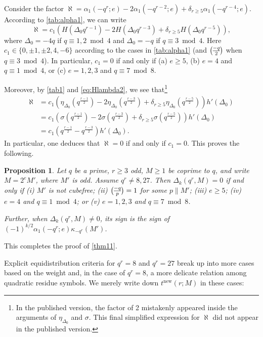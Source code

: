 \documentclass[11pt]{amsart}
\newcommand{\new}{\mathrm{new}}
\renewcommand{\mod}{\bmod}
\newcommand{\leg}{\overwithdelims ()}
\numberwithin{lem}{section}
\newtheorem{prop}[lem]{Proposition}
\theoremstyle{remark}
\theoremstyle{definition}
\numberwithin{equation}{section}
\begin{document}
Consider the factor $\aleph = \alpha_1(-q^r; e)  - 2\alpha_1(-q^{r-2}; e) + \delta_{r \ge 5} \alpha_1(-q^{r-4}; e)$.  According to \cref{tab:alpha1}, we can write
\[ \aleph = c_1 \left( H(\Delta_0 q^{r-1}) - 2 H(\Delta_0 q^{r-3}) + \delta_{r \ge 5} H(\Delta_0 q^{r-5}) \right), \]
where $\Delta_0 = -4q$ if $q \equiv 1, 2 \mod 4$ and $\Delta_0 =-q$ if $q \equiv 3 \mod 4$.  Here $c_1 \in \{ 0, \pm 1, \pm 2, 4, -6 \}$ according to the cases in \cref{tab:alpha1} (and ${-q \leg 2}$ when $q \equiv 3 \mod 4$).  In particular, $c_1 = 0$ if and only if
 (a) $e \ge 5$, (b) $e = 4$ and $q \equiv 1 \mod 4$, or (c)
$e = 1,2,3$ and $q \equiv 7 \mod 8$.

Moreover, by \cref{tab1} and \eqref{eq:Hlambda2}, we see that\footnote{In the published version, the factor of 2 mistakenly appeared inside the arguments of $\eta_{\Delta_0}$ and $\sigma$.  This final simplified expression for $\aleph$ did not appear in the published version.}
\begin{align*}
 \aleph &= c_1  \left( \eta_{\Delta_0}(q^{\frac{r-1}2}) - 2\eta_{\Delta_0}(q^{\frac{r-3}2})
+ \delta_{r \ge 5}\eta_{\Delta_0}( q^{\frac{r-5}2} ) \right) h'(\Delta_0) \\
&= c_1  \left( \sigma(q^{\frac{r-1}2}) - 2\sigma(q^{\frac{r-3}2})
+ \delta_{r \ge 5}\sigma ( q^{\frac{r-5}2} ) \right) h'(\Delta_0) \\
&= c_1 \left(q^{\frac{r-1}2}  - q^{\frac{r-3}2} \right) h'(\Delta_0).
\end{align*}
In particular, one deduces that $\aleph = 0$ if and only if $c_1 = 0$.
This proves the following.

\begin{prop}
Let $q$ be a prime, $r \ge 3$ odd, $M \ge 1$ be coprime to $q$, and write $M=2^e M'$, where $M'$ is odd.  Assume $q^r \ne 8, 27$.  Then
$\Delta_k(q^r,M) = 0$ if and only if 
(i) $M'$ is not cubefree; (ii) ${-q \leg p} = 1$ for some $p \parallel M'$; (iii) $e \ge 5$;
(iv) $e = 4$ and $q \equiv 1 \mod 4$; or
(v) $e = 1, 2, 3$ and $q \equiv 7 \mod 8$.

Further, when $\Delta_k(q^r,M) \ne 0$, its sign is the sign of $(-1)^{k/2} \alpha_1(-q^r; e) \kappa_{-q^r}(M')$.
\end{prop}

This completes the proof of \cref{thm11}.

Explicit equidistribution criteria for $q^r = 8$ and $q^r = 27$ break up into more cases based on the weight and, in the case of $q^r = 8$, a more delicate relation among quadratic residue symbols.  We merely write down $t^\new(r;M)$ in these cases:
\end{document}
